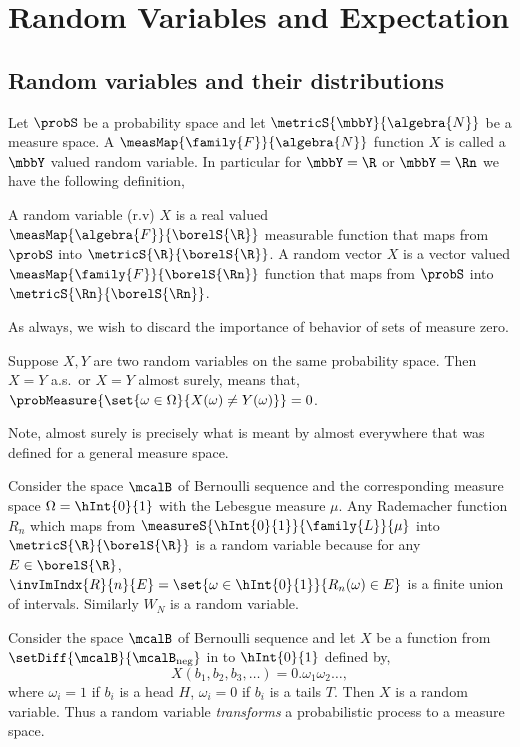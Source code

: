 \chapter{Random Variables and Expectation}
\section{Random variables and their distributions}
Let $\probS$ be a probability space and let $\metricS{\mbbY}{\algebra{N}}$ be a measure space. A
$\measMap{\family{F}}{\algebra{N}}$ function $X$ is called a $\mbbY$ valued random variable.
In particular for $\mbbY = \R$ or $\mbbY = \Rn$ we have the following definition,
\begin{Definition}[name=Random variable]
    A random variable (r.v) $X$ is a real valued 
    $\measMap{\algebra{F}}{\borelS{\R}}$ measurable function that maps from $\probS$ into
    $\metricS{\R}{\borelS{\R}}$. A random vector $X$ is a vector valued $\measMap{\family{F}}{\borelS{\Rn}}$
    function that maps from $\probS$ into $\metricS{\Rn}{\borelS{\Rn}}$.
\end{Definition}
As always, we wish to discard the importance of behavior of sets of measure zero.
\begin{Definition}[name=Almost surely]
    Suppose $X,Y$ are two random variables on the same probability space. Then $X = Y$ a.s.~or $X = Y$ almost
    surely, means that,
    $\probMeasure{\set{\omega\in\Omega}{X(\omega) \neq Y(\omega)} }= 0$.
\end{Definition}
Note, almost surely is precisely what is meant by almost everywhere that was defined for a general measure
space.
\begin{Example}
    Consider the space $\mcalB$ of Bernoulli sequence and the corresponding measure space $\Omega = \hInt{0}{1}$
    with the Lebesgue measure $\mu$. Any Rademacher function $R_n$ which maps from
    $\measureS{\hInt{0}{1}}{\family{L}}{\mu}$ into $\metricS{\R}{\borelS{\R}}$ 
    is a random variable because for any $E\in\borelS{\R}$, 
    $\invImIndx{R}{n}{E} = \set{\omega\in\hInt{0}{1}}{R_n(\omega)\in E}$ is a finite union of
    intervals. Similarly $W_N$ is a random variable.
\end{Example}
\begin{Example}
    Consider the space $\mcalB$ of Bernoulli sequence and let $X$ be a function from
    $\setDiff{\mcalB}{\mcalB_{\text{neg}}}$ in to $\hInt{0}{1}$ defined by,
    \[X(b_1,b_2,b_3,\dots) = 0.\omega_1\omega_2\dots,\]
    where $\omega_i = 1$ if $b_i$ is a head $H$, $\omega_i = 0$ if $b_i$ is a tails $T$. Then $X$ is a random
    variable. Thus a random variable \emph{transforms} a probabilistic process to a measure space.
\end{Example}
